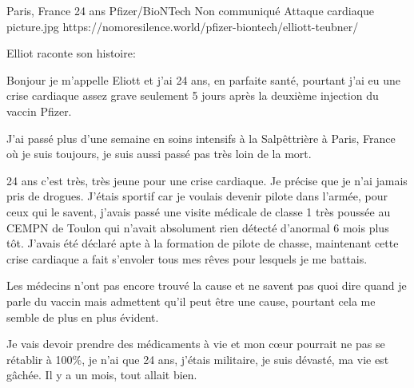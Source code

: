 {Paris, France}
{24 ans}
{Pfizer/BioNTech}
{Non communiqué}
{Attaque cardiaque}
{picture.jpg}
{https://nomoresilence.world/pfizer-biontech/elliott-teubner/}
{

Elliot raconte son histoire:

Bonjour je m'appelle Eliott et j'ai 24 ans, en parfaite santé, pourtant j'ai eu
une crise cardiaque assez grave seulement 5 jours après la deuxième injection du
vaccin Pfizer.

J'ai passé plus d'une semaine en soins intensifs à la Salpêttrière à Paris,
France où je suis toujours, je suis aussi passé pas très loin de la mort.

24 ans c'est très, très jeune pour une crise cardiaque. Je précise que je n'ai
jamais pris de drogues. J'étais sportif car je voulais devenir pilote dans
l'armée, pour ceux qui le savent, j'avais passé une visite médicale de classe 1
très poussée au CEMPN de Toulon qui n'avait absolument rien détecté d'anormal 6
mois plus tôt. J'avais été déclaré apte à la formation de pilote de chasse,
maintenant cette crise cardiaque a fait s'envoler tous mes rêves pour lesquels
je me battais.

Les médecins n'ont pas encore trouvé la cause et ne savent pas quoi dire quand
je parle du vaccin mais admettent qu'il peut être une cause, pourtant cela me
semble de plus en plus évident.

Je vais devoir prendre des médicaments à vie et mon cœur pourrait ne pas se
rétablir à 100\%, je n'ai que 24 ans, j'étais militaire, je suis dévasté, ma vie
est gâchée. Il y a un mois, tout allait bien.

}
